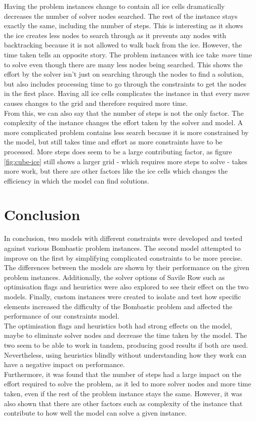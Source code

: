 \documentclass{article}
\newcommand{\n}[0]{\\[\baselineskip]}
\begin{document}
\noindent
Having the problem instances change to contain all ice cells dramatically decreases the number of solver nodes searched. The rest of the instance stays exactly the same, including the number of steps. This is interesting as it shows the ice creates less nodes to search through as it prevents any nodes with backtracking because it is not allowed to walk back from the ice. However, the time taken tells an opposite story. The problem instances with ice take \textit{more} time to solve even though there are many less nodes being searched. This shows the effort by the solver isn't just on searching through the nodes to find a solution, but also includes processing time to go through the constraints to get the nodes in the first place. Having all ice cells complicates the instance in that every move causes changes to the grid and therefore required more time. 
\n
From this, we can also say that the number of steps is not the only factor. The complexity of the instance changes the effort taken by the solver and model. A more complicated problem contains less search because it is more constrained by the model, but still takes time and effort as more constraints have to be processed. More steps does seem to be a large contributing factor, as figure \ref{fig:cube-ice} still shows a larger grid - which requires more steps to solve - takes more work, but there are other factors like the ice cells which changes the efficiency in which the model can find solutions.


\section{Conclusion}
In conclusion, two models with different constraints were developed and tested against various Bombastic problem instances. The second model attempted to improve on the first by simplifying complicated constraints to be more precise. The differences between the models are shown by their performance on the given problem instances. Additionally, the solver options of Savile Row such as optimisation flags and heuristics were also explored to see their effect on the two models. Finally, custom instances were created to isolate and test how specific elements increased the difficulty of the Bombastic problem and affected the performance of our constraints model.
\n
The optimisation flags and heuristics both had strong effects on the model, maybe to eliminate solver nodes and decrease the time taken by the model. The two seem to be able to work in tandem, producing good results if both are used. Nevertheless, using heuristics blindly without understanding how they work can have a negative impact on performance.
\n
Furthermore, it was found that the number of steps had a large impact on the effort required to solve the problem, as it led to more solver nodes and more time taken, even if the rest of the problem instance stays the same. However, it was also shown that there are other factors such as complexity of the instance that contribute to how well the model can solve a given instance.






\printbibliography
\end{document}
